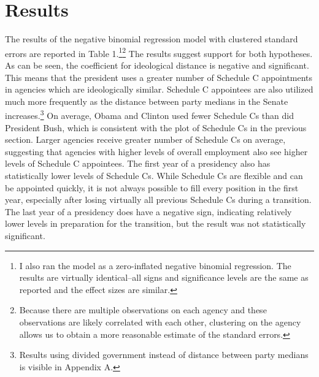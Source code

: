 \documentclass[12pt]{article}
\begin{document}
\section*{Results}
The results of the negative binomial regression model with clustered standard errors are reported in Table 1.\footnote{I also ran the model as a zero-inflated negative binomial regression. The results are virtually identical--all signs and significance levels are the same as reported and the effect sizes are similar.}\footnote{Because there are multiple observations on each agency and these observations are likely correlated with each other, clustering on the agency allows us to obtain a more reasonable estimate of the standard errors.} The results suggest support for both hypotheses. As can be seen, the coefficient for ideological distance is negative and significant. This means that the president uses a greater number of Schedule C appointments in agencies which are ideologically similar. Schedule C appointees are also utilized much more frequently as the distance between party medians in the Senate increases.\footnote{Results using divided government instead of distance between party medians is visible in Appendix A.} On average, Obama and Clinton used fewer Schedule Cs than did President Bush, which is consistent with the plot of Schedule Cs in the previous section. Larger agencies receive greater number of Schedule Cs on average, suggesting that agencies with higher levels of overall employment also see higher levels of Schedule C appointees. The first year of a presidency also has statistically lower levels of Schedule Cs. While Schedule Cs are flexible and can be appointed quickly, it is not always possible to fill every position in the first year, especially after losing virtually all previous Schedule Cs during a transition. The last year of a presidency does have a negative sign, indicating relatively lower levels in preparation for the transition, but the result was not statistically significant. 
\end{document}
